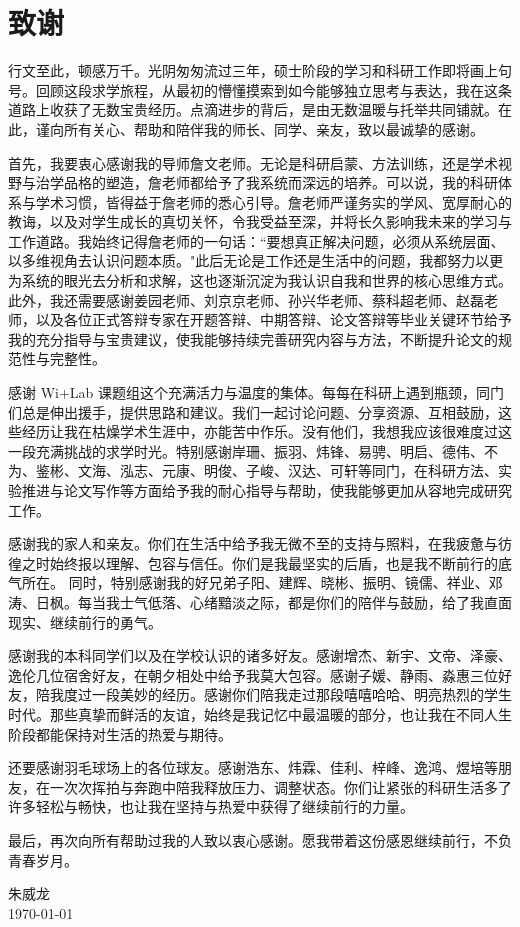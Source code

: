 \chapter{致谢}

行文至此，顿感万千。光阴匆匆流过三年，硕士阶段的学习和科研工作即将画上句号。回顾这段求学旅程，从最初的懵懂摸索到如今能够独立思考与表达，我在这条道路上收获了无数宝贵经历。点滴进步的背后，是由无数温暖与托举共同铺就。在此，谨向所有关心、帮助和陪伴我的师长、同学、亲友，致以最诚挚的感谢。

首先，我要衷心感谢我的导师詹文老师。无论是科研启蒙、方法训练，还是学术视野与治学品格的塑造，詹老师都给予了我系统而深远的培养。可以说，我的科研体系与学术习惯，皆得益于詹老师的悉心引导。詹老师严谨务实的学风、宽厚耐心的教诲，以及对学生成长的真切关怀，令我受益至深，并将长久影响我未来的学习与工作道路。我始终记得詹老师的一句话：``要想真正解决问题，必须从系统层面、以多维视角去认识问题本质。"此后无论是工作还是生活中的问题，我都努力以更为系统的眼光去分析和求解，这也逐渐沉淀为我认识自我和世界的核心思维方式。此外，我还需要感谢姜园老师、刘京京老师、孙兴华老师、蔡科超老师、赵磊老师，以及各位正式答辩专家在开题答辩、中期答辩、论文答辩等毕业关键环节给予我的充分指导与宝贵建议，使我能够持续完善研究内容与方法，不断提升论文的规范性与完整性。

感谢 Wi+Lab 课题组这个充满活力与温度的集体。每每在科研上遇到瓶颈，同门们总是伸出援手，提供思路和建议。我们一起讨论问题、分享资源、互相鼓励，这些经历让我在枯燥学术生涯中，亦能苦中作乐。没有他们，我想我应该很难度过这一段充满挑战的求学时光。特别感谢岸珊、振羽、炜锋、易骋、明启、德伟、不为、鉴彬、文海、泓志、元康、明俊、子峻、汉达、可轩等同门，在科研方法、实验推进与论文写作等方面给予我的耐心指导与帮助，使我能够更加从容地完成研究工作。

感谢我的家人和亲友。你们在生活中给予我无微不至的支持与照料，在我疲惫与彷徨之时始终报以理解、包容与信任。你们是我最坚实的后盾，也是我不断前行的底气所在。
同时，特别感谢我的好兄弟子阳、建辉、晓彬、振明、镜儒、祥业、邓涛、日枫。每当我士气低落、心绪黯淡之际，都是你们的陪伴与鼓励，给了我直面现实、继续前行的勇气。

感谢我的本科同学们以及在学校认识的诸多好友。感谢增杰、新宇、文帝、泽豪、逸伦几位宿舍好友，在朝夕相处中给予我莫大包容。感谢子媛、静雨、淼惠三位好友，陪我度过一段美妙的经历。感谢你们陪我走过那段嘻嘻哈哈、明亮热烈的学生时代。那些真挚而鲜活的友谊，始终是我记忆中最温暖的部分，也让我在不同人生阶段都能保持对生活的热爱与期待。

还要感谢羽毛球场上的各位球友。感谢浩东、炜霖、佳利、梓峰、逸鸿、煜培等朋友，在一次次挥拍与奔跑中陪我释放压力、调整状态。你们让紧张的科研生活多了许多轻松与畅快，也让我在坚持与热爱中获得了继续前行的力量。

最后，再次向所有帮助过我的人致以衷心感谢。愿我带着这份感恩继续前行，不负青春岁月。
\vskip 108pt
\begin{flushright}
	朱威龙\makebox[1cm]{} \\
	\today
\end{flushright}

